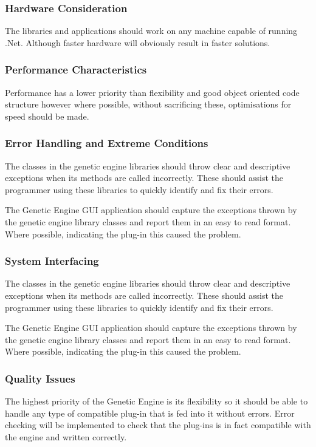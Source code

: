 \subsubsection{Hardware Consideration}
The libraries and applications should work on any machine capable of running .Net. Although faster hardware will obviously result in faster solutions.

\subsubsection{Performance Characteristics}
Performance has a lower priority than flexibility and good object oriented code structure however where possible, without sacrificing these, optimisations for speed should be made.

\subsubsection{Error Handling and Extreme Conditions}
The classes in the genetic engine libraries should throw clear and descriptive exceptions when its methods are called incorrectly. These should assist the programmer using these libraries to quickly identify and fix their errors.

The Genetic Engine GUI application should capture the exceptions thrown by the genetic engine library classes and report them in an easy to read format. Where possible, indicating the plug-in this caused the problem.

\subsubsection{System Interfacing}
The classes in the genetic engine libraries should throw clear and descriptive exceptions when its methods are called incorrectly. These should assist the programmer using these libraries to quickly identify and fix their errors.

The Genetic Engine GUI application should capture the exceptions thrown by the genetic engine library classes and report them in an easy to read format. Where possible, indicating the plug-in this caused the problem.

\subsubsection{Quality Issues}
The highest priority of the Genetic Engine is its flexibility so it should be able to handle any type of compatible plug-in that is fed into it without errors. Error checking will be implemented to check that the plug-ins is in fact compatible with the engine and written correctly.

